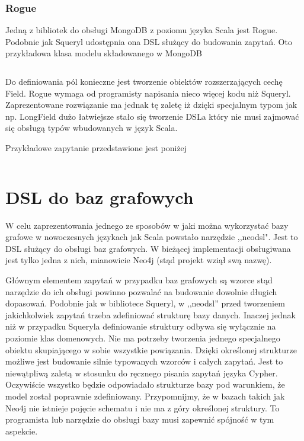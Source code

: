 \documentclass[brudnopis]{xmgr}
\begin{document}
\subsection{Rogue}
Jedną z bibliotek do obsługi MongoDB z poziomu języka Scala jest Rogue. Podobnie jak Squeryl udostępnia ona DSL służący do budowania zapytań. Oto przykładowa klasa modelu składowanego w MongoDB

\inputminted{scala}{listings/scala/rogue-model.scala}

Do definiowania pól konieczne jest tworzenie obiektów rozszerzających cechę Field. Rogue wymaga od programisty napisania nieco więcej kodu niż Squeryl. Zaprezentowane rozwiązanie ma jednak tę zaletę iż dzięki specjalnym typom jak np. LongField dużo łatwiejsze stało się tworzenie DSLa który nie musi zajmować się obsługą typów wbudowanych w język Scala.

Przykładowe zapytanie przedstawione jest poniżej

\inputminted{scala}{listings/scala/rogue-query.scala}

\chapter{DSL do baz grafowych}

W celu zaprezentowania jednego ze sposobów w jaki można wykorzystać bazy grafowe w nowoczesnych językach jak Scala powstało narzędzie ,,neodsl". Jest to DSL służący do obsługi baz grafowych. W bieżącej implementacji obsługiwana jest tylko jedna z nich, mianowicie Neo4j (stąd projekt wziął swą nazwę). 

Głównym elementem zapytań w przypadku baz grafowych są wzorce stąd narzędzie do ich obsługi powinno pozwalać na budowanie dowolnie długich dopasowań. Podobnie jak w bibliotece Squeryl, w ,,neodsl'' przed tworzeniem jakichkolwiek zapytań trzeba zdefiniować strukturę bazy danych. Inaczej jednak niż w przypadku Squeryla definiowanie struktury odbywa się wyłącznie na poziomie klas domenowych. Nie ma potrzeby tworzenia jednego specjalnego obiektu skupiającego w sobie wszystkie powiązania. Dzięki określonej strukturze możliwe jest budowanie silnie typowanych wzorców i całych zapytań. Jest to niewątpliwą zaletą w stosunku do ręcznego pisania zapytań języka Cypher. Oczywiście wszystko będzie odpowiadało strukturze bazy pod warunkiem, że model został poprawnie zdefiniowany. Przypomnijmy, że w bazach takich jak Neo4j nie istnieje pojęcie schematu i nie ma z góry określonej struktury. To programista lub narzędzie do obsługi bazy musi zapewnić spójność w tym aspekcie.
\end{document}
